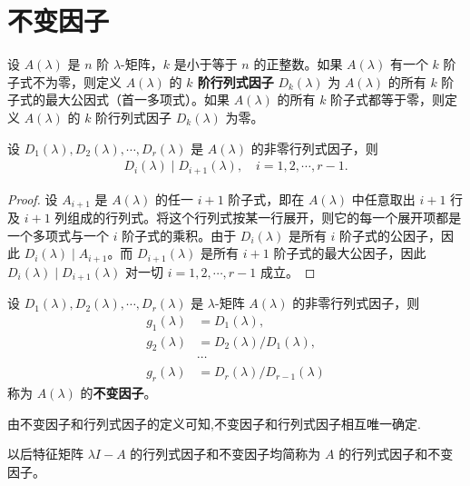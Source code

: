 \documentclass[../../main.tex]{subfiles}
\begin{document}
\section{不变因子}

\begin{definition}[$k$阶行列式因子]
设 $A(\lambda)$ 是 $n$ 阶 $\lambda$-矩阵，$k$ 是小于等于 $n$ 的正整数。如果 $A(\lambda)$ 有一个 $k$ 阶子式不为零，则定义 $A(\lambda)$ 的 \textbf{$k$ 阶行列式因子} $D_k(\lambda)$ 为 $A(\lambda)$ 的所有 $k$ 阶子式的最大公因式（首一多项式）。如果 $A(\lambda)$ 的所有 $k$ 阶子式都等于零，则定义 $A(\lambda)$ 的 $k$ 阶行列式因子 $D_k(\lambda)$ 为零。 
\end{definition}

\begin{lemma}\label{lemma:i阶行列式因子整除i+1阶行列式因子}
设 $D_1(\lambda), D_2(\lambda), \cdots, D_r(\lambda)$ 是 $A(\lambda)$ 的非零行列式因子，则
\begin{align*}
D_i(\lambda)\mid D_{i + 1}(\lambda),\quad i = 1, 2, \cdots, r - 1.
\end{align*}
\end{lemma}
\begin{proof}
设 $A_{i + 1}$ 是 $A(\lambda)$ 的任一 $i + 1$ 阶子式，即在 $A(\lambda)$ 中任意取出 $i + 1$ 行及 $i + 1$ 列组成的行列式。将这个行列式按某一行展开，则它的每一个展开项都是一个多项式与一个 $i$ 阶子式的乘积。由于 $D_i(\lambda)$ 是所有 $i$ 阶子式的公因子，因此 $D_i(\lambda)\mid A_{i + 1}$。而 $D_{i + 1}(\lambda)$ 是所有 $i + 1$ 阶子式的最大公因子，因此 $D_i(\lambda)\mid D_{i + 1}(\lambda)$ 对一切 $i = 1, 2, \cdots, r - 1$ 成立。 

\end{proof}

\begin{definition}[不变因子]
设 $D_1(\lambda), D_2(\lambda), \cdots, D_r(\lambda)$ 是 $\lambda$-矩阵 $A(\lambda)$ 的非零行列式因子，则
\begin{align*}
g_1(\lambda)&=D_1(\lambda),\\
g_2(\lambda)&=D_2(\lambda)/D_1(\lambda),\\
&\cdots\\
g_r(\lambda)&=D_r(\lambda)/D_{r - 1}(\lambda)
\end{align*}
称为 $A(\lambda)$ 的\textbf{不变因子}。 
\end{definition}
\begin{note}
由不变因子和行列式因子的定义可知,不变因子和行列式因子相互唯一确定.
\end{note}
\begin{remark}
以后特征矩阵 $\lambda I - A$ 的行列式因子和不变因子均简称为 $A$ 的行列式因子和不变因子。 
\end{remark}
\end{document}
